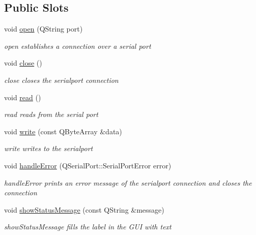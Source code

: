 \subsection*{Public Slots}
\begin{DoxyCompactItemize}
\item 
\mbox{\label{classMotor_a6f235ed0f9e1ba51cc6cd1dcd823d850}} 
void \hyperlink{classMotor_a6f235ed0f9e1ba51cc6cd1dcd823d850}{open} (Q\+String port)
\begin{DoxyCompactList}\small\item\em open establishes a connection over a serial port \end{DoxyCompactList}\item 
\mbox{\label{classMotor_a6302ab51842ec23bd8b36d56e5ae9416}} 
void \hyperlink{classMotor_a6302ab51842ec23bd8b36d56e5ae9416}{close} ()
\begin{DoxyCompactList}\small\item\em close closes the serialport connection \end{DoxyCompactList}\item 
\mbox{\label{classMotor_adc21685543cb0f520fec7291b4a642f0}} 
void \hyperlink{classMotor_adc21685543cb0f520fec7291b4a642f0}{read} ()
\begin{DoxyCompactList}\small\item\em read reads from the serial port \end{DoxyCompactList}\item 
void \hyperlink{classMotor_a8305ead4b01433cb8a01eb5440a8b570}{write} (const Q\+Byte\+Array \&data)
\begin{DoxyCompactList}\small\item\em write writes to the serialport \end{DoxyCompactList}\item 
void \hyperlink{classMotor_a4c95080f6faf87f02844093e948d485a}{handle\+Error} (Q\+Serial\+Port\+::\+Serial\+Port\+Error error)
\begin{DoxyCompactList}\small\item\em handle\+Error prints an error message of the serialport connection and closes the connection \end{DoxyCompactList}\item 
void \hyperlink{classMotor_a3d9df9be923b64306fa28dff13ceaa2e}{show\+Status\+Message} (const Q\+String \&message)
\begin{DoxyCompactList}\small\item\em show\+Status\+Message fills the label in the G\+UI with text \end{DoxyCompactList}\item 

\end{DoxyCompactItemize}
